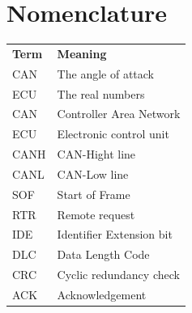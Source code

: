 \documentclass{ctuthesis}
\begin{document}
\maketitle
\chapter*{Nomenclature}

\noindent
\begin{tabularx}{\linewidth}
  { l >{\raggedright\arraybackslash}X }
\bfseries Term & \bfseries Meaning \\\Midrule
CAN  & The angle of attack \\
ECU  & The real numbers \\
CAN & Controller Area Network \\
ECU & Electronic control unit \\
CANH & CAN-Hight line \\
CANL & CAN-Low line \\
SOF & Start of Frame \\
RTR & Remote request \\
IDE & Identifier Extension bit \\
DLC & Data Length Code \\
CRC & Cyclic redundancy check \\
ACK & Acknowledgement \\
\end{tabularx}
\end{document}

